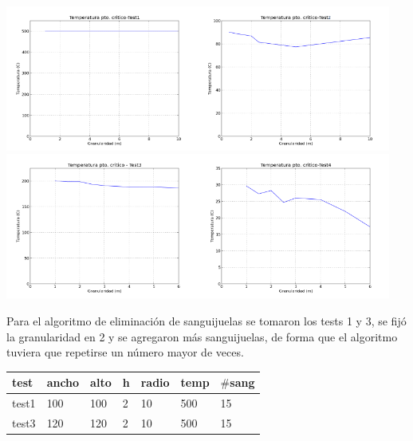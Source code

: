 \documentclass[a4paper]{article}
\begin{document}
\begin{center}
 \includegraphics[width=180pt]{img/temp1.png}\includegraphics[width=180pt]{img/temp2.png} 
\includegraphics[width=180pt]{img/temp3.png}\includegraphics[width=180pt]{img/temp4.png}

\end{center}

Para el algoritmo de eliminación de sanguijuelas se tomaron los tests 1 y 3, se fijó la granularidad en 2 y se agregaron más sanguijuelas, de forma que el algoritmo tuviera que repetirse un número mayor de veces. \\
  \begin{tabular}{ l|l l l l l l}
  test & ancho & alto & h & radio & temp & $\#$sang \\
  \hline
  test1 & 100 & 100 & 2 & 10 & 500 & 15 \\
  test3 & 120 & 120 & 2 & 10 & 500 & 15 
\end{tabular} 
\end{document}
